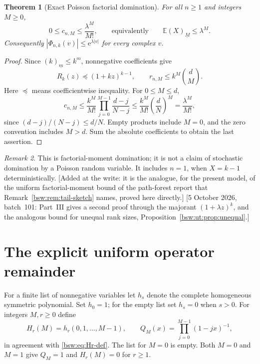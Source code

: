 \documentclass[11pt,letterpaper]{article}
\newtheorem{theorem}{Theorem}[section]
\theoremstyle{definition}
\theoremstyle{remark}
\newtheorem{remark}[theorem]{Remark}
\newcommand{\EE}{\mathbb E}
\newcommand{\ee}{\mathrm e}
\newcommand{\fall}[2]{(#1)_{\underline{#2}}}
\begin{document}
\begin{theorem}[Exact Poisson factorial domination]\label{bsw:rp:thm:bound}
For all $n\ge1$ and integers $M\ge0$,
\begin{equation}\label{bsw:rp:eq:bound}
 0\le c_{n,M}\le\frac{\lambda^M}{M!},
 \qquad\text{equivalently}\qquad \EE\fall XM\le\lambda^M.
\end{equation}
Consequently $|\Phi_{n,k}(v)|\le\ee^{\lambda|v|}$ for every complex $v$.
\end{theorem}

\begin{proof}
Since $\fall km\le k^m$, nonnegative coefficients give
\[
 R_k(z)\preceq(1+kz)^{k-1},\qquad
 r_{n,M}\le k^M\binom dM.
\]
Here $\preceq$ means coefficientwise inequality.  For $0\le M\le d$,
\[
 c_{n,M}\le\frac{k^M}{M!}\prod_{j=0}^{M-1}\frac{d-j}{N-j}
 \le\frac{k^M}{M!}\left(\frac dN\right)^M
 =\frac{\lambda^M}{M!},
\]
since $(d-j)/(N-j)\le d/N$.  Empty products include $M=0$, and the zero
convention includes $M>d$.  Sum the absolute coefficients to obtain the
last assertion.
\end{proof}

\begin{remark}
This is factorial-moment domination; it is not a claim of stochastic
domination by a Poisson random variable.  It includes $n=1$, when $X=k-1$
deterministically.  [Added at the write: it is the analogue, for the
present model, of the uniform factorial-moment bound of the path-forest
report that Remark~\ref{bsw:rem:tail-sketch} names, proved here directly.]
[5 October 2026, batch~101: Part~III gives a second proof through the
majorant $(1+\lambda z)^k$, and the analogous bound for unequal rank sizes,
Proposition~\ref{bsw:ut:prop:unequal}.]
\end{remark}

\section{The explicit uniform operator remainder}\label{bsw:rp:sec:operator}

For a finite list of nonnegative variables let $h_s$ denote the complete
homogeneous symmetric polynomial.  Set $h_0=1$; for the empty list set
$h_s=0$ when $s>0$.  For integers $M,r\ge0$ define
\[
 H_r(M)=h_r(0,1,\ldots,M-1),\qquad
 Q_M(x)=\prod_{j=0}^{M-1}(1-jx)^{-1},
\]
in agreement with \eqref{bsw:eq:Hr-def}.  The list for $M=0$ is empty.
Both $M=0$ and $M=1$ give $Q_M=1$ and $H_r(M)=0$ for $r\ge1$.
\end{document}
